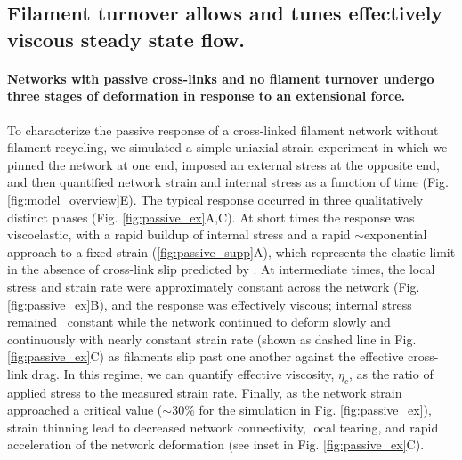 \subsection{Filament turnover allows and tunes effectively viscous steady state flow.}

\paragraph{Networks with passive cross-links and no filament turnover undergo three stages of deformation in response to an extensional force.} 

To characterize the passive response of a cross-linked filament network without filament recycling, we simulated a simple uniaxial strain experiment in which we pinned the network at one end, imposed an external stress at the opposite end, and then quantified network strain and internal stress as a function of time (Fig. \ref{fig:model_overview}E). The typical response occurred in three qualitatively distinct phases (Fig. \ref{fig:passive_ex}A,C). At short times the response was viscoelastic, with a rapid buildup of internal stress and a rapid $\sim$exponential approach to a fixed strain (\ref{fig:passive_supp}A), which represents the elastic limit in the absence of cross-link slip predicted by \cite{theo_hlm}. At intermediate times, the local stress and strain rate were approximately constant across the network (Fig. \ref{fig:passive_ex}B), and the response was effectively viscous; internal stress remained ~constant while the network continued to deform slowly and continuously with nearly constant strain rate (shown as dashed line in Fig. \ref{fig:passive_ex}C) as filaments slip past one another against the effective cross-link drag. In this regime, we can quantify effective viscosity, $\eta_c$,  as the ratio of applied stress to the measured strain rate. Finally, as the network strain approached a critical value ($\sim 30\%$ for the simulation in Fig. \ref{fig:passive_ex}), strain thinning lead to decreased network connectivity, local tearing, and rapid acceleration of the network deformation (see inset in Fig. \ref{fig:passive_ex}C).


